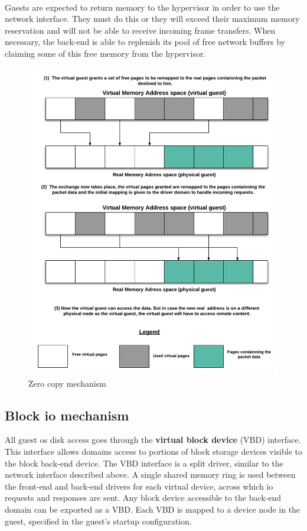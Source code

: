 \paragraph{} Guests are expected to return memory to the hypervisor in order to use the network interface. They must do this or they will exceed their maximum memory reservation and will not be able to receive incoming frame transfers. When necessary, the back-end is able to replenish its pool of free network buffers by claiming some of this free memory from the hypervisor.

\begin{figure}[!h]
    \centering
    \includegraphics[scale=0.65]{fig02/zero_copy.png}
    \caption{Zero copy mechanism}
    \label{fig:zero_copy}
\end{figure}



\subsection{Block \acrshort{io} mechanism}
All guest \acrshort{os} disk access goes through the \textbf{virtual block device} (VBD) interface. This interface allows domains access to portions of block storage devices visible to the block back-end device. The VBD interface is a split driver, similar to the network interface described above. A single shared memory ring is used between the front-end and back-end drivers for each virtual device, across which \acrshort{io} requests and responses are sent. Any block device accessible to the back-end domain can be exported as a VBD. Each VBD is mapped to a device node in the guest, specified in the guest's startup configuration.

